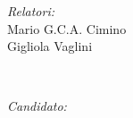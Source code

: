 \begin{titlepage}
    \begin{minipage}{0.4\textwidth}
    \begin{flushleft} \large
    \emph{Relatori:}\\
    Mario G.C.A. Cimino\\
    Gigliola Vaglini
    \end{flushleft}
    \end{minipage}
    ~
    \begin{minipage}{0.4\textwidth}
    \begin{flushright} \large
    \emph{Candidato:} \\
    \@author \\ 
    \vspace{1.2\baselineskip}
    \end{flushright}
    \end{minipage}\\[1cm]
    
    \vfill

    {\large \@date }\\[1cm]

   
\end{titlepage}

\restoregeometry
